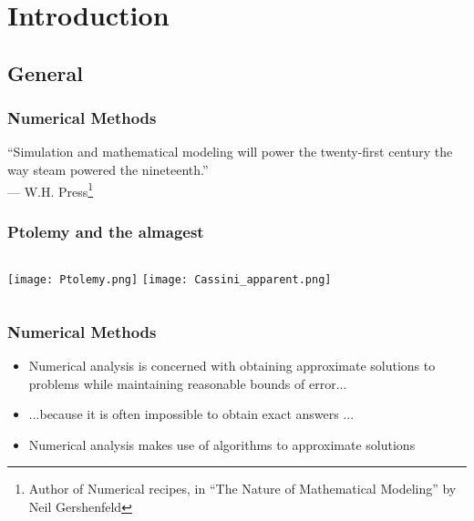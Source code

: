 \section{Introduction}
\subsection*{General}

\begin{frame}
 \frametitle{Numerical Methods}
 \renewcommand{\thefootnote}{$\star$} 
  {\LARGE ``Simulation and mathematical modeling will power the twenty-first century the way steam powered the nineteenth.''\\
   {\vspace{1em}\hspace{2em} --- W.H. Press\footnote{Author of Numerical recipes, in ``The Nature of Mathematical Modeling'' by Neil Gershenfeld }}} \\
  \vspace{-1cm}
  \flushright{}
\end{frame}

\begin{frame}
 \frametitle{Ptolemy and the almagest}
 \begin{columns}
   \centering
     \texttt{[image: Ptolemy.png]}
   \centering
     \texttt{[image: Cassini\_apparent.png]}   
 \end{columns} \vspace{1em}
\end{frame}

\begin{frame}
 \frametitle{Numerical Methods}
 \begin{itemize}
  \item Numerical analysis is concerned with obtaining approximate solutions to problems while maintaining reasonable bounds of error...
  \item ...because it is often impossible to obtain exact answers ...
  \item Numerical analysis makes use of algorithms to
approximate solutions
 \end{itemize}
\end{frame}

